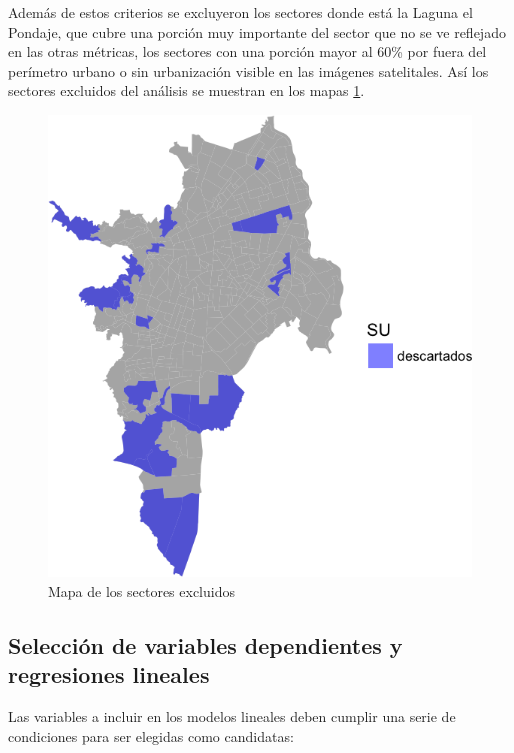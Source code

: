 \documentclass[12pt,]{book}
\begin{document}
Además de estos criterios se excluyeron los sectores donde está la
Laguna el Pondaje, que cubre una porción muy importante del sector que
no se ve reflejado en las otras métricas, los sectores con una porción
mayor al 60\% por fuera del perímetro urbano o sin urbanización visible
en las imágenes satelitales. Así los sectores excluidos del análisis se
muestran en los mapas \ref{fig:mapa-excluidos}.

\begin{figure}
\includegraphics[width=1\linewidth]{tesis-unigis_files/figure-latex/mapa-excluidos-1} \caption{Mapa de los sectores excluidos}\label{fig:mapa-excluidos}
\end{figure}

\subsection{Selección de variables dependientes y regresiones
lineales}\label{seleccion-de-variables-dependientes-y-regresiones-lineales}

Las variables a incluir en los modelos lineales deben cumplir una serie
de condiciones para ser elegidas como candidatas:
\end{document}
